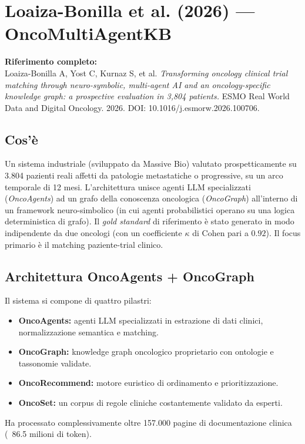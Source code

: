 \documentclass[12pt, a4paper]{article}
\begin{document}
\newpage
\section{Loaiza-Bonilla et al. (2026) --- OncoMultiAgentKB}

\textbf{Riferimento completo:}\\
Loaiza-Bonilla A, Yost C, Kurnaz S, et al. \textit{Transforming oncology clinical trial matching through neuro-symbolic, multi-agent AI and an oncology-specific knowledge graph: a prospective evaluation in 3,804 patients.} ESMO Real World Data and Digital Oncology. 2026. DOI: 10.1016/j.esmorw.2026.100706.

\subsection{Cos'è}
Un sistema industriale (sviluppato da Massive Bio) valutato prospetticamente su 3.804 pazienti reali affetti da patologie metastatiche o progressive, su un arco temporale di 12 mesi. L'architettura unisce agenti LLM specializzati (\textit{OncoAgents}) ad un grafo della conoscenza oncologica (\textit{OncoGraph}) all'interno di un framework neuro-simbolico (in cui agenti probabilistici operano su una logica deterministica di grafo). Il \textit{gold standard} di riferimento è stato generato in modo indipendente da due oncologi (con un coefficiente $\kappa$ di Cohen pari a $0.92$). Il focus primario è il matching paziente-trial clinico.

\subsection{Architettura OncoAgents + OncoGraph}
Il sistema si compone di quattro pilastri:
\begin{itemize}[leftmargin=1.8em, itemsep=2pt]
  \item \textbf{OncoAgents:} agenti LLM specializzati in estrazione di dati clinici, normalizzazione semantica e matching.
  \item \textbf{OncoGraph:} knowledge graph oncologico proprietario con ontologie e tassonomie validate.
  \item \textbf{OncoRecommend:} motore euristico di ordinamento e prioritizzazione.
  \item \textbf{OncoSet:} un corpus di regole cliniche costantemente validato da esperti.
\end{itemize}
Ha processato complessivamente oltre 157.000 pagine di documentazione clinica (~86.5 milioni di token).
\end{document}
